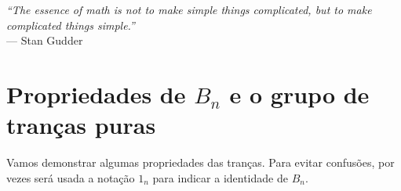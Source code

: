 \chaptermark{}
%
\hfill%
\begin{minipage}{10cm}
\begin{flushright}
\rightskip=0.5cm
\textit{``The essence of math is not to make simple things complicated, but to make complicated things simple.''}
\\[0.1cm]
\rightskip=0.5cm
--- Stan Gudder
\end{flushright}
\end{minipage}

\section{Propriedades de \texorpdfstring{$B_n$}{Bn} e o grupo de tranças puras}

    Vamos demonstrar algumas propriedades das tranças. Para evitar confusões, por vezes será usada a notação $1_n$ para indicar a identidade de $B_n$.
	
	
	
